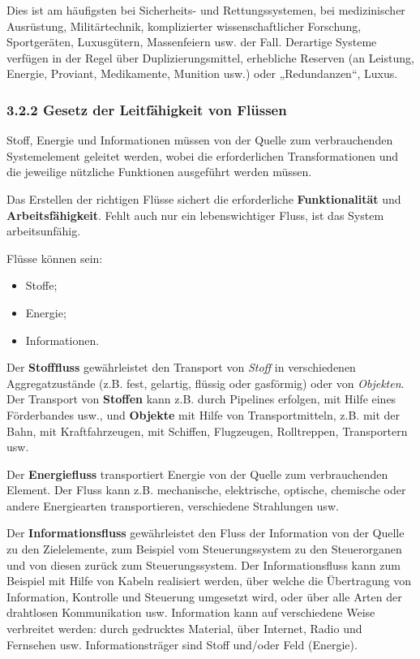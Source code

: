 \documentclass[11pt,a4paper]{article}
\begin{document}
Dies ist am häufigsten bei Sicherheits- und Rettungssystemen, bei
medizinischer Ausrüstung, Militärtechnik, komplizierter wissenschaftlicher
Forschung, Sportgeräten, Luxusgütern, Massenfeiern usw. der Fall.  Derartige
Systeme verfügen in der Regel über Duplizierungsmittel, erhebliche Reserven
(an Leistung, Energie, Proviant, Medikamente, Munition usw.)  oder
„Redundanzen“, Luxus.

\subsubsection{3.2.2 Gesetz der Leitfähigkeit von Flüssen}

Stoff, Energie und Informationen müssen von der Quelle zum verbrauchenden
Systemelement geleitet werden, wobei die erforderlichen Transformationen und
die jeweilige nützliche Funktionen ausgeführt werden müssen.

Das Erstellen der richtigen Flüsse sichert die erforderliche
\textbf{Funktionalität} und \textbf{Arbeits\-fähigkeit}. Fehlt auch nur ein
lebenswichtiger Fluss, ist das System arbeitsunfähig.

Flüsse können sein:
\begin{itemize}[noitemsep] 
\item Stoffe;
\item Energie;
\item Informationen.
\end{itemize}
Der \textbf{Stofffluss} gewährleistet den Transport von \emph{Stoff} in
verschiedenen Aggregatzustände (z.B. fest, gelartig, flüssig oder gasförmig)
oder von \emph{Objekten}.  Der Transport von \textbf{Stoffen} kann z.B. durch
Pipelines erfolgen, mit Hilfe eines Förderbandes usw., und \textbf{Objekte}
mit Hilfe von Transportmitteln, z.B. mit der Bahn, mit Kraftfahrzeugen, mit
Schiffen, Flugzeugen, Rolltreppen, Transportern usw.

Der \textbf{Energiefluss} transportiert Energie von der Quelle zum
verbrauchenden Element.  Der Fluss kann z.B. mechanische, elektrische,
optische, chemische oder andere Energiearten transportieren, verschiedene
Strahlungen usw.

Der \textbf{Informationsfluss} gewährleistet den Fluss der Information von der
Quelle zu den Zielelemente, zum Beispiel vom Steuerungssystem zu den
Steuerorganen und von diesen zurück zum Steuerungssystem. Der
Informationsfluss kann zum Beispiel mit Hilfe von Kabeln realisiert werden,
über welche die Übertragung von Information, Kontrolle und Steuerung umgesetzt
wird, oder über alle Arten der drahtlosen Kommunikation usw. Information kann
auf verschiedene Weise verbreitet werden: durch gedrucktes Material, über
Internet, Radio und Fernsehen usw.  Informationsträger sind Stoff und/oder
Feld (Energie).
\end{document}
